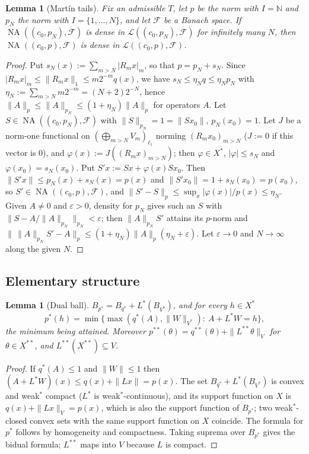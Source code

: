 \documentclass[10pt]{amsart}
\newtheorem{lemma}[theorem]{Lemma}
\theoremstyle{definition}
\theoremstyle{remark}
\newcommand{\NA}{\operatorname{NA}}
\newcommand{\N}{\mathbb N}
\begin{document}
\begin{lemma}[Mart\'in tails]\label{lem:martintail}
Fix an admissible $T$, let $p$ be the norm with $I=\N$ and $p_N$ the norm
with $I=\{1,\dots,N\}$, and let $\mathcal F$ be a Banach space.  If
$\NA((c_0,p_N),\mathcal F)$ is dense in $\mathcal L((c_0,p_N),\mathcal F)$
for infinitely many $N$, then $\NA((c_0,p),\mathcal F)$ is dense in
$\mathcal L((c_0,p),\mathcal F)$.
\end{lemma}

\begin{proof}
Put $s_N(x):=\sum_{m>N}|R_mx|_m$, so that $p=p_N+s_N$.  Since
$|R_mx|_m\le\|R_mx\|_1\le m2^{-m}q(x)$, we have $s_N\le\eta_Nq\le\eta_Np_N$
with $\eta_N:=\sum_{m>N}m2^{-m}=(N+2)2^{-N}$, hence $\|A\|_p\le\|A\|_{p_N}\le
(1+\eta_N)\|A\|_p$ for operators $A$.  Let $S\in\NA((c_0,p_N),\mathcal F)$
with $\|S\|_{p_N}=1=\|Sx_0\|$, $p_N(x_0)=1$.  Let $J$ be a norm-one
functional on $(\bigoplus_{m>N}V_m)_{\ell_1}$ norming $(R_mx_0)_{m>N}$
($J:=0$ if this vector is $0$), and $\varphi(x):=J((R_mx)_{m>N})$; then
$\varphi\in X^*$, $|\varphi|\le s_N$ and $\varphi(x_0)=s_N(x_0)$.  Put
$S'x:=Sx+\varphi(x)Sx_0$.  Then $\|S'x\|\le p_N(x)+s_N(x)=p(x)$ and
$\|S'x_0\|=1+s_N(x_0)=p(x_0)$, so $S'\in\NA((c_0,p),\mathcal F)$, and
$\|S'-S\|_p\le\sup_x|\varphi(x)|/p(x)\le\eta_N$.  Given $A\ne0$ and
$\varepsilon>0$, density for $p_N$ gives such an $S$ with
$\|S-A/\|A\|_{p_N}\|_{p_N}<\varepsilon$; then $\|A\|_{p_N}S'$ attains its
$p$-norm and $\|\,\|A\|_{p_N}S'-A\|_p\le(1+\eta_N)\|A\|_p(\eta_N+
\varepsilon)$.  Let $\varepsilon\to0$ and $N\to\infty$ along the given
$N$.
\end{proof}

\subsection{Elementary structure}

\begin{lemma}[Dual ball]\label{lem:dualball}
$B_{p^*}=B_{q^*}+L^*(B_{V^*})$, and for every $h\in X^*$
\[
 p^*(h)=\min\{\max(q^*(A),\|W\|_{V^*}):\ A+L^*W=h\},
\]
the minimum being attained.  Moreover $p^{**}(\theta)=q^{**}(\theta)+
\|L^{**}\theta\|_V$ for $\theta\in X^{**}$, and $L^{**}(X^{**})\subseteq V$.
\end{lemma}

\begin{proof}
If $q^*(A)\le1$ and $\|W\|\le1$ then $(A+L^*W)(x)\le q(x)+\|Lx\|=p(x)$.
The set $B_{q^*}+L^*(B_{V^*})$ is convex and weak$^*$ compact ($L^*$ is
weak$^*$-continuous), and its support function on $X$ is
$q(x)+\|Lx\|_V=p(x)$, which is also the support function of $B_{p^*}$; two
weak$^*$-closed convex sets with the same support function on $X$
coincide.  The formula for $p^*$ follows by homogeneity and compactness.
Taking suprema over $B_{p^*}$ gives the bidual formula; $L^{**}$ maps into
$V$ because $L$ is compact.
\end{proof}
\end{document}
